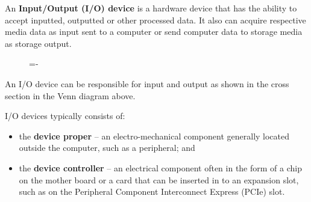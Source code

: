\documentclass[a4paper]{systems-software}
\begin{document}
An \textbf{Input/Output (I/O) device} is a hardware device that has the ability to accept inputted, outputted or other processed data. It also can acquire respective media data as input sent to a computer or send computer data to storage media as storage output.

\begin{figure}[H]
  \lineskip=-\fboxrule
\end{figure}

An I/O device can be responsible for input and output as shown in the cross section in the Venn diagram above.

\newpage

I/O devices typically consists of:
\begin{itemize}
	\item the \textbf{device proper} -- an electro-mechanical component generally located outside the computer, such as a peripheral; and
	\item the \textbf{device controller} -- an electrical component often in the form of a chip on the mother board or a card that can be inserted in to an expansion slot, such as on the Peripheral Component Interconnect Express (PCIe) slot.
\end{itemize}
\end{document}
